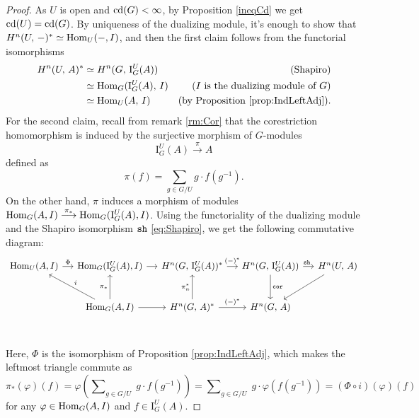 \documentclass[a4paper, oneside]{memoir}
\begin{document}
\begin{proof}
    As \(U\) is open and \(\operatorname{cd}(G)<\infty\), by Proposition \ref{ineqCd} we get \(\operatorname{cd}(U)=\operatorname{cd}(G)\). By uniqueness of the dualizing module, it's enough to show that \(H^{n}( U, \, - )^*\simeq\operatorname{Hom}_U(-,I)\), and then the first claim follows from the functorial isomorphisms
    \begin{align*}
        H^{n}( U, \, A )^* & \simeq H^{n}( G, \, \mathrm{I}_G^U(A) )   & \text{(Shapiro)}                               \\
                      & \simeq \operatorname{Hom}_G(\mathrm{I}_G^U(A),\,I) & \text{($I$ is the dualizing module of $G$)}    \\
                      & \simeq \operatorname{Hom}_U(A,\,I)                 & \text{(by Proposition \ref{prop:IndLeftAdj})}.
    \end{align*}
    For the second claim, recall from remark \ref{rm:Cor} that the corestriction homomorphism is induced by the surjective morphism of \(G\)-modules
    \[\mathrm{I}_G^U(A) \overset{\pi}{\longrightarrow} A\]
    defined as
    \[ \pi(f)= \sum_{g\in G/U}{g\cdot f(g^{-1})}.\]
    On the other hand, $\pi$ induces a morphism of modules \(\operatorname{Hom}_G(A,I)\overset{\pi_*}{\longrightarrow}\operatorname{Hom}_G(\mathrm{I}_G^U(A),I)\).
    Using the functoriality of the dualizing module and the Shapiro isomorphism $\operatorname{\mathtt{sh}}$ \eqref{eq:Shapiro},
    we get the following commutative diagram:
    \[
        \begin{tikzcd}[column sep=small, row sep=large]
            \Hom_U(A,I)
            \rar["\Phi"] &
            \Hom_G(\mathrm{I}_G^U(A), I)
            \rar &
            \H{n}{G}{\mathrm{I}_G^U(A)}^*
            \rar["(-)^*"]&\H{n}{G}{\mathrm{I}_G^U(A)}
            \rar["\sh\ "]
            \ar[d, "\Cor"]&\H{n}{U}{A}\ar[dl] \\
            &
            \Hom_G(A,I) \ar[swap, lu, "i"]
            \ar[u, "\pi_*"]
            \rar &
            \H{n}{G}{A}^*
            \ar[u,"\pi_n^*"]
            \rar["(-)^*"] &
            \H{n}{G}{A} \\
        \end{tikzcd}
    \]
    Here, $\Phi$ is the isomorphism of Proposition \ref{prop:IndLeftAdj},
    which makes the leftmost triangle commute as
    \[
        \pi_*(\varphi)(f) = \varphi\left(\sum\nolimits_{g\in G/U}\;{g\cdot f(g^{-1} )}\right) = \sum\nolimits_{g\in G/U}\;{g\cdot \varphi(f(g^{-1}))} = (\Phi\circ i) (\varphi)(f)
    \]
    for any \(\varphi\in\operatorname{Hom}_G(A,I)\) and \(f\in\mathrm{I}_G^U(A)\).
\end{proof}
\end{document}
